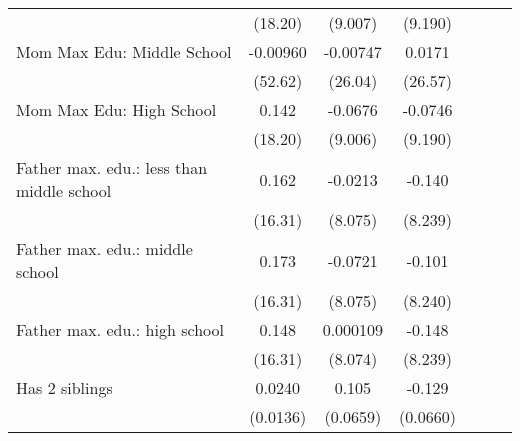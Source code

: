 {\begin{tabular}{l*{6}{c}}
                    &     (18.20)         &     (9.007)         &     (9.190)         &                     &                     &                     \\
\addlinespace
Mom Max Edu: Middle School&    -0.00960         &    -0.00747         &      0.0171         &                     &                     &                     \\
                    &     (52.62)         &     (26.04)         &     (26.57)         &                     &                     &                     \\
\addlinespace
Mom Max Edu: High School&       0.142         &     -0.0676         &     -0.0746         &                     &                     &                     \\
                    &     (18.20)         &     (9.006)         &     (9.190)         &                     &                     &                     \\
\addlinespace
Father max. edu.: less than middle school&       0.162         &     -0.0213         &      -0.140         &                     &                     &                     \\
                    &     (16.31)         &     (8.075)         &     (8.239)         &                     &                     &                     \\
\addlinespace
Father max. edu.: middle school&       0.173         &     -0.0721         &      -0.101         &                     &                     &                     \\
                    &     (16.31)         &     (8.075)         &     (8.240)         &                     &                     &                     \\
\addlinespace
Father max. edu.: high school&       0.148         &    0.000109         &      -0.148         &                     &                     &                     \\
                    &     (16.31)         &     (8.074)         &     (8.239)         &                     &                     &                     \\
\addlinespace
Has 2 siblings      &      0.0240         &       0.105         &      -0.129         &                     &                     &                     \\
                    &    (0.0136)         &    (0.0659)         &    (0.0660)         &                     &                     &                     \\

\end{tabular}}
